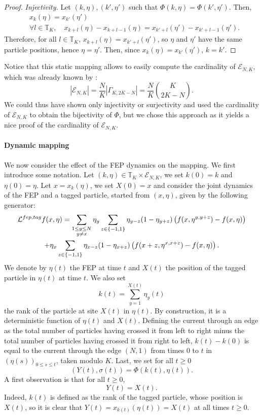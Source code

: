 \documentclass[11pt,a4paper]{article}
\newcommand{\T}{\mathbb{T}}
\newcommand{\FEP}{\textsc{fep}}
\newcommand{\eqs}[1]{\begin{equation}#1\end{equation}}
\begin{document}
\begin{proof}
\textit{Injectivity. }Let $(k,\eta), (k', \eta')$ such that $\Phi(k,\eta) =  \Phi(k', \eta')$. Then, 
\begin{align}
&x_k(\eta) = x_{k'}(\eta') \\
&\forall l \in \T_K, \quad x_{k+l}(\eta)-x_{k+l-1}(\eta) = x_{k'+l}(\eta')-x_{k'+l-1}(\eta').
\end{align}
Therefore, for all $l \in \T_K$, $x_{k+l}(\eta) = x_{k'+l}(\eta')$, so $\eta$ and $\eta'$ have the same particle positions, hence $\eta = \eta'$. Then, since $x_k(\eta) = x_{k'}(\eta')$, $k=k'$.
\end{proof}

Notice that this static mapping allows to easily compute the cardinality of $\mathcal{E}_{N,K}$, which was already known by \cite{gabel_facilitated_2010}: 
\eqs{|\mathcal{E}_{N,K}| = \frac{N}{K} |\Gamma_{K,2K-N}| = \frac{N}{K} \binom{K}{2K-N}.}
We could thus have shown only injectivity or surjectivity and used the cardinality of $\mathcal{E}_{N,K}$ to obtain the bijectivity of $\Phi$, but we chose this approach as it yields a nice proof of the cardinality of $\mathcal{E}_{N,K}$.

\paragraph{Dynamic mapping} We now consider the effect of the FEP dynamics on the mapping. We first introduce some notation. 
Let $(k, \eta) \in \T_K \times \mathcal{E}_{N,K}$, we set $k(0) = k$ and $\eta(0) = \eta$. Let $x = x_k(\eta)$, we set $X(0) = x$ and consider the joint dynamics of the FEP and a tagged particle, started from $(x, \eta)$, given by the following generator:
\begin{multline}
\mathcal{L}^{\FEP, tag}f(x,\eta) = \sum_{\substack{1\le y \le N\\ y \neq x}}\eta_y \sum_{z \in \{-1,1\} } \eta_{y-z}(1-\eta_{y+z}) \left(f(x, \eta^{y,y+z}) - f(x, \eta)\right) \\+ \eta_x \sum_{z \in \{-1,1\} } \eta_{x-z}(1-\eta_{x+z}) \left(f(x + z, \eta^{x,x+z}) - f(x, \eta)\right).
\end{multline}
We denote by $\eta(t)$ the FEP at time $t$ and $X(t)$ the position of the tagged particle in $\eta(t)$ at time $t$. We also set
\eqs{k(t) = \sum_{y=1}^{X(t)} \eta_y(t)}
the rank of the particle at site $X(t)$ in $\eta(t)$. By construction, it is a deterministic function of $\eta(t)$ and $X(t)$. 
Defining the current through an edge as the total number of particles having crossed it from left to right minus the total number of particles having crossed it from right to left, $k(t)-k(0)$ is equal to the current through the edge $(N,1)$ from times 0 to $t$ in $\left(\eta(s)\right)_{0 \le s \le t}$, taken modulo $K$.
Last, we set for all $t\ge 0$
\eqs{(Y(t), \sigma(t)) = \Phi(k(t), \eta(t)).}
A first observation is that for all $t \ge 0$, 
\eqs{Y(t) = X(t).}
Indeed, $k(t)$ is defined as the rank of the tagged particle, whose position is $X(t)$, so it is clear that $Y(t) = x_{k(t)}(\eta(t)) = X(t)$ at all times $t\ge 0$.
\end{document}
